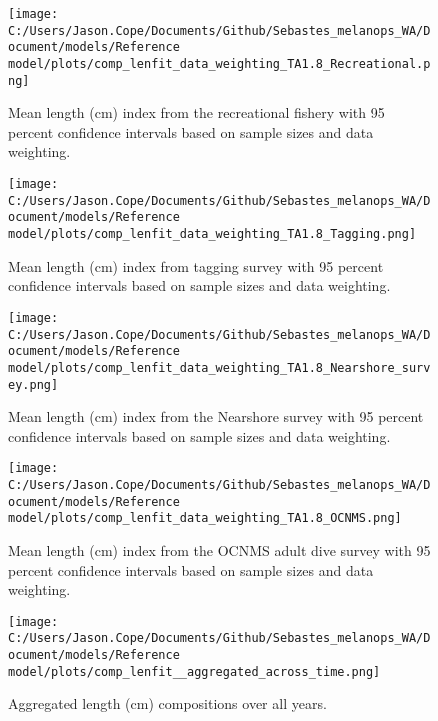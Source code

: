 \documentclass[11pt,
  english,
  letterpaper,
]{article}
\begin{document}
\pagebreak

\begin{figure}
\centering
\texttt{[image: C:/Users/Jason.Cope/Documents/Github/Sebastes\_melanops\_WA/Document/models/Reference model/plots/comp\_lenfit\_data\_weighting\_TA1.8\_Recreational.png]}
\caption{Mean length (cm) index from the recreational fishery with 95 percent confidence intervals based on sample sizes and data weighting.\label{fig:rec-mean-len-fit}}
\end{figure}

\pagebreak

\begin{figure}
\centering
\texttt{[image: C:/Users/Jason.Cope/Documents/Github/Sebastes\_melanops\_WA/Document/models/Reference model/plots/comp\_lenfit\_data\_weighting\_TA1.8\_Tagging.png]}
\caption{Mean length (cm) index from tagging survey with 95 percent confidence intervals based on sample sizes and data weighting.\label{fig:tag-mean-len-fit}}
\end{figure}

\pagebreak

\begin{figure}
\centering
\texttt{[image: C:/Users/Jason.Cope/Documents/Github/Sebastes\_melanops\_WA/Document/models/Reference model/plots/comp\_lenfit\_data\_weighting\_TA1.8\_Nearshore\_survey.png]}
\caption{Mean length (cm) index from the Nearshore survey with 95 percent confidence intervals based on sample sizes and data weighting.\label{fig:nearshore-mean-len-fit}}
\end{figure}

\pagebreak

\begin{figure}
\centering
\texttt{[image: C:/Users/Jason.Cope/Documents/Github/Sebastes\_melanops\_WA/Document/models/Reference model/plots/comp\_lenfit\_data\_weighting\_TA1.8\_OCNMS.png]}
\caption{Mean length (cm) index from the OCNMS adult dive survey with 95 percent confidence intervals based on sample sizes and data weighting.\label{fig:ocnms-mean-len-fit}}
\end{figure}

\pagebreak

\begin{figure}
\centering
\texttt{[image: C:/Users/Jason.Cope/Documents/Github/Sebastes\_melanops\_WA/Document/models/Reference model/plots/comp\_lenfit\_\_aggregated\_across\_time.png]}
\caption{Aggregated length (cm) compositions over all years.\label{fig:agg-len-fit}}
\end{figure}
\end{document}
